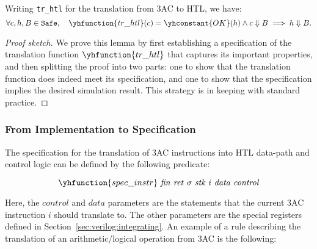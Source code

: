 \begin{lemma}\label{lemma:htl}
  Writing \texttt{tr\_htl} for the translation from 3AC to HTL, we have:
  \begin{equation*}
    \forall c, h, B \in \texttt{Safe},\quad \yhfunction{tr\_htl} (c) = \yhconstant{OK} (h) \land c \Downarrow B \implies h \Downarrow B.
  \end{equation*}
\end{lemma}

\begin{proof}[Proof sketch]
  We prove this lemma by first establishing a specification of the translation
  function $\yhfunction{tr\_htl}$ that captures its important properties, and
  then splitting the proof into two parts: one to show that the translation
  function does indeed meet its specification, and one to show that the
  specification implies the desired simulation result. This strategy is in
  keeping with standard \compcert{} practice.

\end{proof}

\subsubsection{From Implementation to Specification}\label{sec:proof:3ac_htl:specification}


The specification for the translation of 3AC instructions into HTL data-path and
control logic can be defined by the following predicate:

\begin{equation*}
  \yhfunction{spec\_instr}\ \mathit{fin}\ \mathit{ret}\ \sigma\ \mathit{stk}\ i\ \mathit{data}\ \mathit{control}
\end{equation*}

\noindent Here, the $\mathit{control}$ and $\mathit{data}$ parameters are the
statements that the current 3AC instruction $i$ should translate to. The other
parameters are the special registers defined in
Section~\ref{sec:verilog:integrating}. An example of a rule describing the
translation of an arithmetic/logical operation from 3AC is the following:

